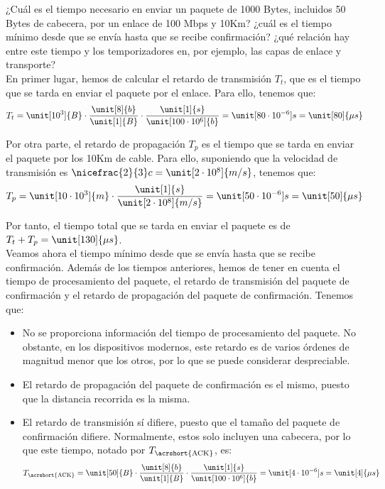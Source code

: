 \begin{ejercicio}
    ¿Cuál es el tiempo necesario en enviar un paquete de 1000 Bytes, incluidos 50 Bytes de cabecera, por un enlace de 100 Mbps y 10Km? ¿cuál es el tiempo mínimo desde que se envía hasta que se recibe confirmación? ¿qué relación hay entre este tiempo y los temporizadores en, por ejemplo, las capas de enlace y transporte?\\

    En primer lugar, hemos de calcular el retardo de transmisión $T_t$, que es el tiempo que se tarda en enviar el paquete por el enlace. Para ello, tenemos que:
    \begin{equation*}
        T_t = \unit[10^3]{B} \cdot \dfrac{\unit[8]{b}}{\unit[1]{B}} \cdot \dfrac{\unit[1]{s}}{\unit[100 \cdot 10^6]{b}} = \unit[80\cdot 10^{-6}]{s} = \unit[80]{\mu s}
    \end{equation*}

    Por otra parte, el retardo de propagación $T_p$ es el tiempo que se tarda en enviar el paquete por los 10Km de cable. Para ello, suponiendo que la velocidad de transmisión es $\nicefrac{2}{3}c = \unit[2\cdot 10^8]{m/s}$, tenemos que:
    \begin{equation*}
        T_p = \unit[10\cdot 10^3]{m} \cdot \dfrac{\unit[1]{s}}{\unit[2\cdot 10^8]{m/s}} = \unit[50\cdot 10^{-6}]{s} =\unit[50]{\mu s}
    \end{equation*}

    Por tanto, el tiempo total que se tarda en enviar el paquete es de $T_t + T_p = \unit[130]{\mu s}$.\\

    Veamos ahora el tiempo mínimo desde que se envía hasta que se recibe confirmación. Además de los tiempos anteriores, hemos de tener en cuenta el tiempo de procesamiento del paquete, el retardo de transmisión del paquete de confirmación y el retardo de propagación del paquete de confirmación. Tenemos que:
    \begin{itemize}
        \item No se proporciona información del tiempo de procesamiento del paquete. No obstante, en los dispositivos modernos, este retardo es de varios órdenes de magnitud menor que los otros, por lo que se puede considerar despreciable.
        \item El retardo de propagación del paquete de confirmación es el mismo, puesto que la distancia recorrida es la misma.
        \item El retardo de transmisión sí difiere, puesto que el tamaño del paquete de confirmación difiere. Normalmente, estos solo incluyen una cabecera, por lo que este tiempo, notado por $T_{\text{\acrshort{ACK}}}$, es:
        \begin{equation*}
            T_{\text{\acrshort{ACK}}} = \unit[50]{B} \cdot \dfrac{\unit[8]{b}}{\unit[1]{B}} \cdot \dfrac{\unit[1]{s}}{\unit[100 \cdot 10^6]{b}} = \unit[4\cdot 10^{-6}]{s} = \unit[4]{\mu s}
        \end{equation*}


\end{itemize}
\end{ejercicio}
